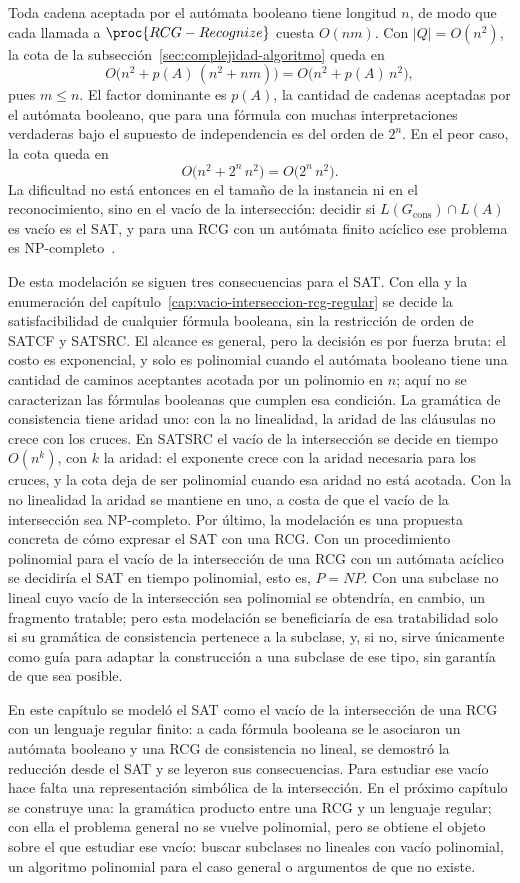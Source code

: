 \documentclass{report}
\theoremstyle{definition}
\theoremstyle{plain}
\begin{document}
Toda cadena aceptada por el autómata booleano tiene longitud $n$, de
modo que cada llamada a $\proc{RCG-Recognize}$ cuesta $O(nm)$. Con
$|Q| = O(n^2)$, la cota de la
subsección~\ref{sec:complejidad-algoritmo} queda en
\[
  O\bigl( n^2 + p(A)\,(n^2 + nm) \bigr) = O\bigl( n^2 + p(A)\,n^2 \bigr),
\]
pues $m \le n$. El factor dominante es $p(A)$, la cantidad de cadenas
aceptadas por el autómata booleano, que para una fórmula con muchas
interpretaciones verdaderas bajo el supuesto de independencia es del
orden de $2^n$. En el peor caso, la cota queda en
\[
  O\bigl( n^2 + 2^n\, n^2 \bigr) = O\bigl( 2^n\, n^2 \bigr).
\]
La dificultad no está entonces en el tamaño de la
instancia ni en el reconocimiento, sino en el vacío de la intersección: decidir si
$L(G_{\mathrm{cons}}) \cap L(A)$ es vacío es el SAT, y para una RCG
con un autómata finito acíclico ese problema es
NP-completo~\cite{bertsch2001rcg}.

De esta modelación se siguen tres consecuencias para el SAT. Con ella
y la enumeración del capítulo~\ref{cap:vacio-interseccion-rcg-regular}
se decide la satisfacibilidad de cualquier fórmula booleana, sin la
restricción de orden de SATCF y SATSRC. El alcance es general, pero la
decisión es por fuerza bruta: el costo es exponencial, y solo es
polinomial cuando el autómata booleano tiene una cantidad de caminos
aceptantes acotada por un polinomio en $n$; aquí no se caracterizan
las fórmulas booleanas que cumplen esa condición. La gramática de consistencia tiene aridad uno: con la
no linealidad, la aridad de las cláusulas no crece con los cruces. En
SATSRC el vacío de la intersección se decide en tiempo $O(n^k)$, con
$k$ la aridad: el exponente crece con la aridad necesaria para los
cruces, y la cota deja de ser polinomial cuando esa aridad no está
acotada. Con la no linealidad la aridad se mantiene en uno, a costa de
que el vacío de la intersección sea NP-completo. Por
último, la modelación es una propuesta concreta de cómo expresar el
SAT con una RCG. Con un procedimiento polinomial para el vacío de la intersección
de una RCG con un autómata acíclico se decidiría el SAT en tiempo
polinomial, esto es, $P = NP$. Con una subclase no lineal cuyo vacío de la intersección sea
polinomial se obtendría, en cambio, un fragmento tratable; pero esta
modelación se beneficiaría de esa tratabilidad solo si su gramática de
consistencia pertenece a la subclase, y, si no, sirve únicamente como
guía para adaptar la construcción a una subclase de ese tipo, sin
garantía de que sea posible.

En este capítulo se modeló el SAT como el vacío de la intersección de
una RCG con un lenguaje regular finito: a cada fórmula booleana se le
asociaron un autómata booleano y una RCG de consistencia no lineal, se
demostró la reducción desde el SAT y se leyeron sus consecuencias.
Para estudiar ese vacío hace falta una
representación simbólica de la intersección. En el próximo capítulo se
construye una: la gramática producto entre una RCG y un lenguaje
regular; con ella el problema general no se vuelve polinomial, pero se
obtiene el objeto sobre el que estudiar ese vacío: buscar subclases no
lineales con vacío polinomial, un algoritmo polinomial para el caso
general o argumentos de que no existe.



\end{document}
